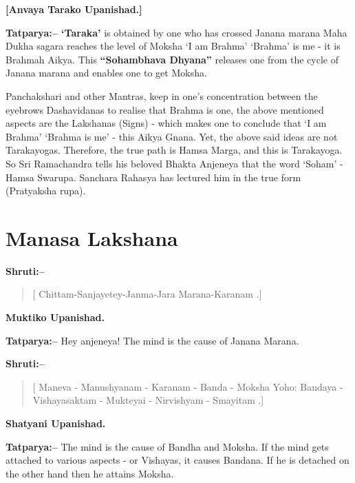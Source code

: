 \begin{flushright}
\textbf{[Anvaya Tarako Upanishad.]}
\end{flushright}

\textbf{Tatparya:– ‘Taraka’} is obtained by one who has crossed Janana marana Maha Dukha sagara reaches the level of Moksha ‘I am Brahma’ ‘Brahma’ is me - it is Brahmah Aikya. This \textbf{“Sohambhava Dhyana”} releases one from the cycle of Janana marana and enables one to get Moksha.

Panchakshari and other Mantras, keep in one's concentration between the eyebrows Dashavidanas to realise that Brahma is one, the above mentioned aspects are the Lakshanas (Signs) - which makes one to conclude that ‘I am Brahma’ ‘Brahma is me’ - this Aikya Gnana. Yet, the above said ideas are not Tarakayogas. Therefore, the true path is Hamsa Marga, and this is Tarakayoga. So Sri Ramachandra tells his beloved Bhakta Anjeneya that the word ‘Soham’ - Hamsa Swarupa. Sanchara Rahasya has lectured him in the true form (Pratyaksha rupa).

\chapter{Manasa Lakshana}

\textbf{Shruti:–}

\begin{verse}
[ Chittam-Sanjayetey-Janma-Jara Marana-Karanam .]
\end{verse}

\begin{flushright}
\textbf{Muktiko Upanishad.}
\end{flushright}

\textbf{Tatparya:–} Hey anjeneya! The mind is the cause of Janana Marana.

\textbf{Shruti:–}

\begin{verse}
[ Maneva - Manushyanam - Karanam - Banda - Moksha Yoho:  Bandaya - Vishayasaktam - Mukteyai - Nirvishyam - Smayitam .]
\end{verse}

\begin{flushright}
\textbf{Shatyani Upanishad.}
\end{flushright}

\textbf{Tatparya:–} The mind is the cause of Bandha and Moksha. If the mind gets attached to various aspects - or Vishayas, it causes Bandana. If he is detached on the other hand then he attains Moksha.

